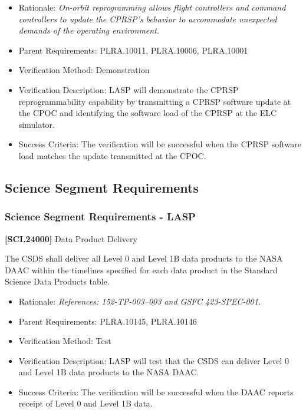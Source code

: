 \documentclass[12pt,oneside,oldfontcommands]{memoir}
\begin{document}
\begin{itemize}
\item{} Rationale: \emph{On-orbit reprogramming allows flight controllers and command controllers to update the CPRSP's behavior to accommodate unexpected demands of the operating environment.}

\item{} Parent Requirements: PLRA.10011, PLRA.10006, PLRA.10001

\item{} Verification Method: Demonstration

\item{} Verification Description: \gls{LASP} will demonstrate the \gls{CPRSP} reprogrammability capability by transmitting a \gls{CPRSP} software update at the \gls{CPOC} and identifying the software load of the \gls{CPRSP} at the \gls{ELC} simulator.

\item{} Success Criteria: The verification will be successful when the \gls{CPRSP} software load matches the update transmitted at the \gls{CPOC}.

\end{itemize}

\subsection{Science Segment Requirements}
\label{sciencesegmentrequirements}

\subsubsection{Science Segment Requirements - LASP}
\label{sciencesegmentrequirements-lasp}

\textbf{[SCI.24000]} Data Product Delivery

The \gls{CSDS} shall deliver all Level 0 and Level 1B data products to the NASA \gls{DAAC} within the timelines specified for each data product in the Standard Science Data Products table.

\begin{itemize}
\item{} Rationale: \emph{References: 152-TP-003--003 and GSFC 423-SPEC-001.}

\item{} Parent Requirements: PLRA.10145, PLRA.10146

\item{} Verification Method: Test

\item{} Verification Description: \gls{LASP} will \gls{test} that the \gls{CSDS} can deliver Level 0 and Level 1B data products to the NASA \gls{DAAC}.

\item{} Success Criteria: The verification will be successful when the \gls{DAAC} reports receipt of Level 0 and Level 1B data.

\end{itemize}
\end{document}
